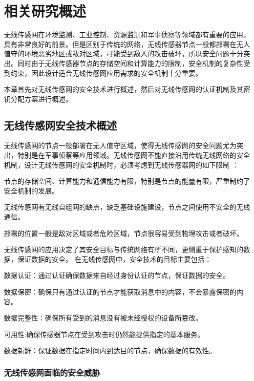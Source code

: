 \chapter{相关研究概述}
无线传感网在环境监测、工业控制、资源监测和军事侦察等领域都有重要的应用，具有非常良好的前景。但是区别于传统的网络，无线传感器节点一般都部署在无人值守的环境恶劣地区或敌对区域，可能受到敌人的攻击破坏，所以安全问题十分突出。同时由于无线传感器节点的存储空间和计算能力的限制，安全机制的复杂性受到约束，因此设计适合无线传感网应用需求的安全机制十分重要。

本章首先对无线传感网的安全技术进行概述，然后对无线传感网的认证机制及其密钥分配方案进行概述。

\section{无线传感网安全技术概述}
无线传感网的节点一般部署在无人值守区域，使得无线传感网的安全问题尤为突出，特别是在军事侦察等应用领域。无线传感网不能直接沿用传统无线网络的安全机制，设计无线传感网的安全机制时，必须考虑到无线传感器网的如下限制
：
\begin{compactitem}
  \item 节点的存储空间、计算能力和通信能力有限，特别是节点的能量有限，严重制约了安全机制的发展。
  \item 无线传感网有无线自组网的缺点，缺乏基础设施建设，节点之间使用不安全的无线通信。
  \item 部署的位置一般是敌对区域或者危险区域，节点很容易受到物理攻击或者破坏。
\end{compactitem}

无线传感网的应用决定了其安全目标与传统网络有所不同，更侧重于保护感知的数据，保证数据的安全。
在无线传感网中，安全技术的目标主要包括：
\begin{compactitem}
  \item 数据认证：通过认证确保数据来自经过身份认证的节点，保证数据的安全。
  \item 数据保密：确保只有通过认证的节点才能获取消息中的内容，不会暴露保密的内容。
  \item 数据完整性：确保所有受到的消息没有被未经授权的设备所篡改。
  \item 可用性:确保传感器节点在受到攻击时仍然能提供指定的基本服务。
  \item 数据新鲜：保证数据在指定时间内到达目的节点，确保数据的有效性。
\end{compactitem}

\subsection{无线传感网面临的安全威胁}

